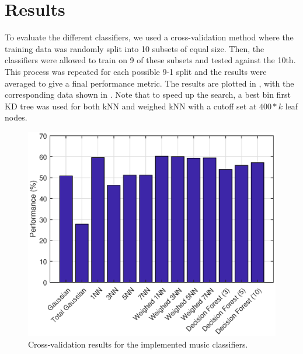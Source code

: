 \documentclass[journal,hidelinks]{IEEEtran}
\begin{document}
\section{Results}

To evaluate the different classifiers, we used a cross-validation method where the training data was randomly split into 10 subsets of equal size. Then, the classifiers were allowed to train on 9 of these subsets and tested against the 10th. This process was repeated for each possible 9-1 split and the results were averaged to give a final performance metric. The results are plotted in , with the corresponding data shown in . Note that to speed up the search, a best bin first KD tree was used for both kNN and weighed kNN with a cutoff set at $400 * k$ leaf nodes.

\begin{figure}[!htb]
  \centering
  \includegraphics[width=\columnwidth]{cross_validation.eps}
  \caption{Cross-validation results for the implemented music classifiers.}
  \label{fig:results}
\end{figure}
\end{document}
